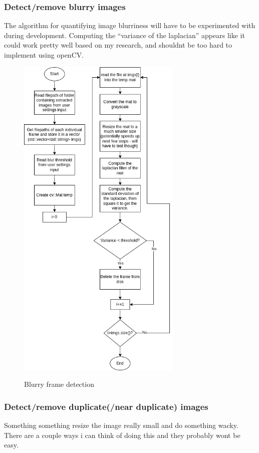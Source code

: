 \documentclass[11pt]{report}
\begin{document}
\subsubsection{Detect/remove blurry images}
The algorithm for quantifying image blurriness will have to be experimented with during development. Computing the ``variance of the laplacian'' appears like it could work pretty well based on my research, and shouldnt be too hard to implement using openCV.
\begin{figure}
	\centering
	\caption{Blurry frame detection}
	\includegraphics[width=0.7\textwidth]{designDiagrams/blurDetection}
	\label{fig:blurDetection}
\end{figure}
\newpage
\subsubsection{Detect/remove duplicate(/near duplicate) images}
Something something resize the image really small and do something wacky. There are a couple ways i can think of doing this and they probably wont be easy.
\end{document}

